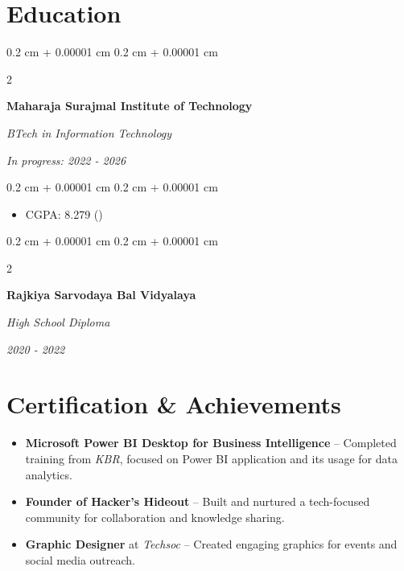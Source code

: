\documentclass[10pt, letterpaper]{article}
\newenvironment{highlights}{
    \begin{itemize}[
        topsep=0.10 cm,
        parsep=0.10 cm,
        partopsep=0pt,
        itemsep=0pt,
        leftmargin=0.4 cm + 10pt
    ]
}{
    \end{itemize}
} %
\newenvironment{onecolentry}{
    \begin{adjustwidth}{
        0.2 cm + 0.00001 cm
    }{
        0.2 cm + 0.00001 cm
    }
}{
    \end{adjustwidth}
} %
\newenvironment{twocolentry}[2][]{
    \onecolentry
    \def\secondColumn{#2}
    \setcolumnwidth{\fill, 4.5 cm}
    \begin{paracol}{2}
}{
    \switchcolumn \raggedleft \secondColumn
    \end{paracol}
    \endonecolentry
} %
\let\hrefWithoutArrow\href
\renewcommand{\href}[2]{\hrefWithoutArrow{#1}{\ifthenelse{\equal{#2}{}}{ }{#2 }\raisebox{.15ex}{\footnotesize \faExternalLink*}}}
\begin{document}
    \section{Education}



        
        \begin{twocolentry}{
            
            
        \textit{In progress: 2022 - 2026}}
            \textbf{Maharaja Surajmal Institute of Technology}

            \textit{BTech in Information Technology}
        \end{twocolentry}

        \vspace{0.10 cm}
        \begin{onecolentry}
            \begin{highlights}
                \item CGPA: 8.279  (\href{https://www.ipusenpai.in/student/06415003122}{})

            \end{highlights}
        \end{onecolentry}

        
 \vspace{0.2 cm}
        

            \begin{twocolentry}{
            
            
        \textit{2020 - 2022}}
            \textbf{Rajkiya Sarvodaya Bal Vidyalaya}

            \textit{High School Diploma}
        \end{twocolentry}




    
   



        \section*{Certification \& Achievements}

\begin{itemize}

  \item \textbf{Microsoft Power BI Desktop for Business Intelligence} – Completed training from \textit{KBR}, focused on Power BI application and its usage for data analytics.
  
  \item \textbf{Founder of Hacker’s Hideout} – Built and nurtured a tech-focused community for collaboration and knowledge sharing.
  
  \item \textbf{Graphic Designer} at \textit{Techsoc} – Created engaging graphics for events and social media outreach.
\end{itemize}
    
    
\end{document}
